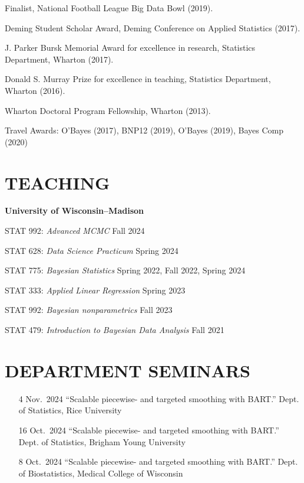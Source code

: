 \documentclass[margin]{res}
\begin{document}
\begin{resume}
Finalist, National Football League Big Data Bowl (2019).

Deming Student Scholar Award, Deming Conference on Applied Statistics (2017).

J. Parker Bursk Memorial Award for excellence in research, Statistics Department, Wharton (2017).

Donald S. Murray Prize for excellence in teaching, Statistics Department, Wharton (2016).

Wharton Doctoral Program Fellowship, Wharton (2013).

Travel Awards: O'Bayes (2017), BNP12 (2019), O'Bayes (2019), Bayes Comp (2020)

\section{TEACHING}

\textbf{University of Wisconsin--Madison} 

STAT 992: {\it Advanced MCMC} \hfill Fall 2024

STAT 628: {\it Data Science Practicum} \hfill Spring 2024

STAT 775: {\it Bayesian Statistics} \hfill Spring 2022, Fall 2022, Spring 2024

STAT 333: {\it Applied Linear Regression} \hfill Spring 2023

STAT 992: {\it Bayesian nonparametrics} \hfill Fall 2023

STAT 479: {\it Introduction to Bayesian Data Analysis} \hfill Fall 2021


\section{DEPARTMENT SEMINARS}

\vspace{0.5in}
{\small
\begin{itemize}

\item[4 Nov.~2024]{``Scalable piecewise- and targeted smoothing with BART.'' Dept. of Statistics, Rice University}

\item[16 Oct.~2024]{``Scalable piecewise- and targeted smoothing with BART.'' Dept. of Statistics, Brigham Young University}

\item[8 Oct.~2024]{``Scalable piecewise- and targeted smoothing with BART.'' Dept. of Biostatistics, Medical College of Wisconsin}


\end{itemize}}
\end{resume}
\end{document}

